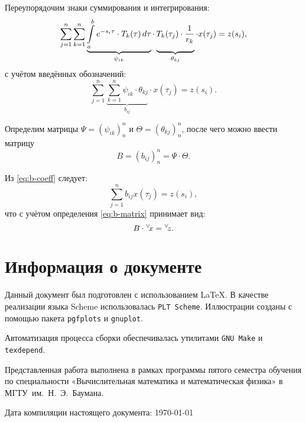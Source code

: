 \documentclass[11pt]{article}
\numberwithin{equation}{section}
\newcommand{\intl}{\int\limits}
\renewcommand{\vec}[1]{{}^{\vee}\negmedspace#1}
\newcommand{\program}[1]{{\tt #1}}
\newcommand{\name}{\textsc}
\newcommand{\mul}{\cdot}
\begin{document}
Переупорядочим знаки суммирования и интегрирования:
\begin{equation}
  \label{eq:psi-theta}
  \sum_{j=1}^n
    \sum_{k=1}^n \underbrace{
      \intl_a^b e^{-s_i\tau}\mul T_k(\tau)\,d\tau}_{\psi_{ik}}
    \mul \underbrace{\vphantom{\intl_a^b} T_k(\tau_j) \mul \frac{1}{r_k}}_{\theta_{kj}}
  \mul x(\tau_j) = z(s_i),
\end{equation}
с учётом введённых обозначений:
\begin{equation}
  \label{eq:b-coeff}
  \sum_{j=1}^n{ 
    \underbrace{\sum_{k=1}^n \psi_{ik} \mul \theta_{kj}}_{b_{ij}} \mul
    x(\tau_j)} = z(s_i).
\end{equation}

Определим матрицы $\Psi = (\psi_{ik})_n^n$ и $\Theta =
(\theta_{kj})_n^n$, после чего можно ввести матрицу 
\begin{equation}
  \label{eq:b-matrix}
  B = (b_{ij})_n^n = \Psi\mul\Theta.
\end{equation}

Из \eqref{eq:b-coeff} следует:
\begin{equation*}
  \sum_{j=1}^nb_{ij}x(\tau_j) = z(s_i),
\end{equation*}
что с учётом определения \eqref{eq:b-matrix} принимает вид:
\begin{equation}
  \label{eq:discrete}
  B\mul\vec{x}=\vec{z}.
\end{equation}

\clearpage
\section{Информация о документе}

Данный документ был подготовлен с использованием \LaTeX{}. В качестве
реализации языка Scheme использовалась \program{PLT Scheme}.
Иллюстрации созданы с помощью пакета \program{pgfplots} и
\program{gnuplot}.

Автоматизация процесса сборки обеспечивалась утилитами
\program{GNU Make} и \program{texdepend}.

Представленная работа выполнена в рамках программы пятого семестра
обучения по специальности «Вычислительная математика и математическая
физика» в МГТУ им. Н. Э. Баумана.

Дата компиляции настоящего документа: \today
\newcommand{\BibEmph}{\name}


\end{document}
